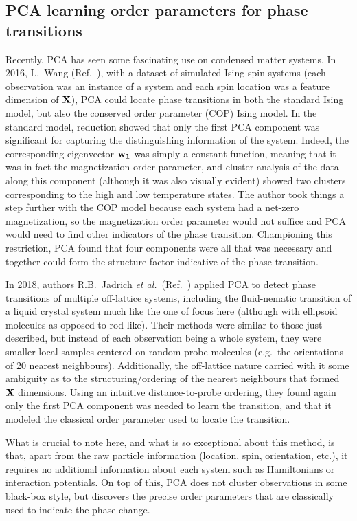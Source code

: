 \subsection{PCA learning order parameters for phase transitions}
Recently, PCA has seen some fascinating use on condensed matter systems. In 2016, L.\ Wang (Ref.\ \cite{wang2016ising}), with a dataset of simulated Ising spin systems (each observation was an instance of a system and each spin location was a feature dimension of $\mathbf{X}$), PCA could locate phase transitions in both the standard Ising model, but also the conserved order parameter (COP) Ising model. In the standard model, reduction showed that only the first PCA component was significant for capturing the distinguishing information of the system. Indeed, the corresponding eigenvector $\mathbf{w_1}$ was simply a constant function, meaning that it was in fact the magnetization order parameter, and cluster analysis of the data along this component (although it was also visually evident) showed two clusters corresponding to the high and low temperature states. The author took things a step further with the COP model because each system had a net-zero magnetization, so the magnetization order parameter would not suffice and PCA would need to find other indicators of the phase transition. Championing this restriction, PCA found that four components were all that was necessary and together could form the structure factor indicative of the phase transition.

In 2018, authors R.B.\ Jadrich \textit{et al.}\ (Ref.\ \cite{jadrich2018offlattice}) applied PCA to detect phase transitions of multiple off-lattice systems, including the fluid-nematic transition of a liquid crystal system much like the one of focus here (although with ellipsoid molecules as opposed to rod-like). Their methods were similar to those just described, but instead of each observation being a whole system, they were smaller local samples centered on random probe molecules (e.g.\ the orientations of 20 nearest neighbours). Additionally, the off-lattice nature carried with it some ambiguity as to the structuring/ordering of the nearest neighbours that formed $\mathbf{X}$ dimensions. Using an intuitive distance-to-probe ordering, they found again only the first PCA component was needed to learn the transition, and that it modeled the classical order parameter used to locate the transition.

What is crucial to note here, and what is so exceptional about this method, is that, apart from the raw particle information (location, spin, orientation, etc.), it requires no additional information about each system such as Hamiltonians or interaction potentials. On top of this, PCA does not cluster observations in some black-box style, but discovers the precise order parameters that are classically used to indicate the phase change.

